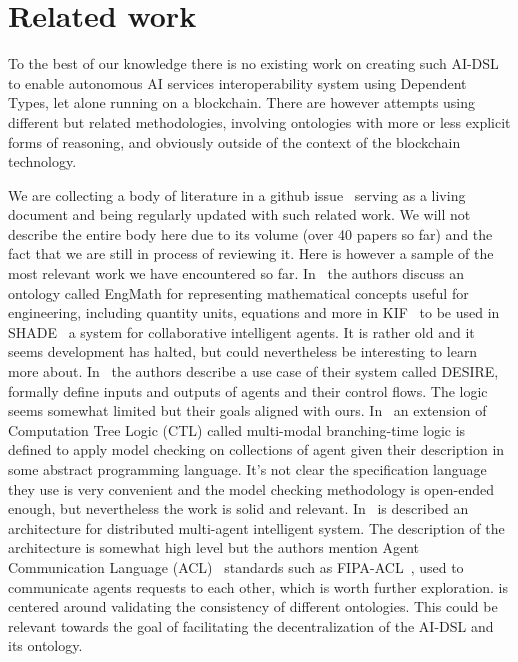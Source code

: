 \documentclass[]{report}
\begin{document}
\section{Related work}
\label{sec:related_work}
To the best of our knowledge there is no existing work on creating
such AI-DSL to enable autonomous AI services interoperability system
using Dependent Types, let alone running on a blockchain.  There are
however attempts using different but related methodologies, involving
ontologies with more or less explicit forms of reasoning, and
obviously outside of the context of the blockchain technology.

We are collecting a body of literature in a github
issue~\cite{AIDSLRelatedWork} serving as a living document and being
regularly updated with such related work.  We will not describe the
entire body here due to its volume (over 40 papers so far) and the
fact that we are still in process of reviewing it.  Here is however a
sample of the most relevant work we have encountered so far.
In~\cite{Gruber_anontology} the authors discuss an ontology called
EngMath for representing mathematical concepts useful for engineering,
including quantity units, equations and more in KIF~\cite{KIF} to be
used in SHADE~\cite{Gruber92towarda} a system for collaborative
intelligent agents.  It is rather old and it seems development has
halted, but could nevertheless be interesting to learn more about.
In~\cite{Brazier1995} the authors describe a use case of their system
called DESIRE, formally define inputs and outputs of agents and their
control flows.  The logic seems somewhat limited but their goals
aligned with ours.  In~\cite{Bourahla20055} an extension of
Computation Tree Logic (CTL) called multi-modal branching-time logic
is defined to apply model checking on collections of agent given their
description in some abstract programming language.  It's not clear the
specification language they use is very convenient and the model
checking methodology is open-ended enough, but nevertheless the work
is solid and relevant.  In~\cite{Desouky2007} is described an
architecture for distributed multi-agent intelligent system.  The
description of the architecture is somewhat high level but the authors
mention Agent Communication Language (ACL)~\cite{Labrou99thecurrent}
standards such as FIPA-ACL~\cite{FIPAACL}, used to communicate agents
requests to each other, which is worth further exploration.
\cite{Roelofs2020} is centered around validating the consistency of
different ontologies.  This could be relevant towards the goal of
facilitating the decentralization of the AI-DSL and its ontology.
\end{document}
